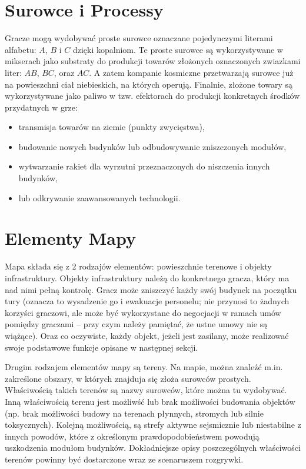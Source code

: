 \documentclass[11pt,a4paper]{article}
\begin{document}
\section{Surowce i Processy}

Gracze mogą wydobywać proste surowce oznaczane pojedynczymi literami alfabetu: $A$, $B$ i $C$ dzięki kopalniom. Te proste surowce są wykorzystywane w mikserach jako substraty do produkcji towarów złożonych oznaczonych zwiazkami liter: $AB$, $BC$, oraz $AC$. A zatem kompanie kosmiczne przetwarzają surowce już na powieszchni ciał niebieskich, na których operują. Finalnie, złożone towary są wykorzystywane jako paliwo w tzw. efektorach do produkcji konkretnych środków przydatnych w grze:
\begin{itemize}
  \setlength{\parskip}{0pt}
  \setlength{\itemsep}{0pt plus 1pt}
\item transmisja towarów na ziemie (punkty zwycięstwa),
\item budowanie nowych budynków lub odbudowywanie zniszczonych modułów,
\item wytwarzanie rakiet dla wyrzutni przeznaczonych do niszczenia innych budynków,
\item lub odkrywanie zaawansowanych technologii.
\end{itemize}

\section{Elementy Mapy}

Mapa składa się z 2 rodzajów elementów: powieszchnie terenowe i objekty infrastruktury. Objekty infrastruktury należą do konkretnego gracza, który ma nad nimi pełną kontrolę. Gracz może zniszczyć każdy swój budynek na początku tury (oznacza to wysadzenie go i ewakuacje personelu; nie przynosi to żadnych korzyści graczowi, ale może być wykorzystane do negocjacji w ramach umów pomiędzy graczami -- przy czym należy pamiętać, że ustne umowy nie są wiążące). Oraz co oczywiste, każdy objekt, jeżeli jest zasilany, może realizować swoje podstawowe funkcje opisane w następnej sekcji.  

Drugim rodzajem elementów mapy są tereny. Na mapie, można znaleźć m.in. zakreślone obszary, w których znajduja się złoża surowców prostych. Właściwością takich terenów są nazwy surowców, które można tu wydobywać. Inną właściwością terenu jest możliwść lub brak możliwości budowania objektów (np. brak możliwości budowy na terenach płynnych, stromych lub silnie toksycznych). Kolejną możliwością, są strefy aktywne sejsmicznie lub niestabilne z innych powodów, które z określonym prawdopodobieństwem powodują uszkodzenia modułom budynków. Dokładniejsze opisy poszczególnych właściwości terenów powinny być dostarczone wraz ze scenaruszem rozgrywki.
\end{document}
